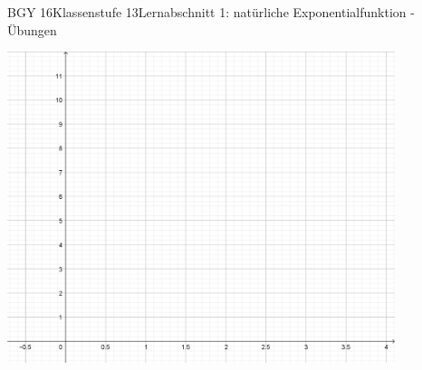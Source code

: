 \documentclass[oneside,openany,headings=optiontotoc,11pt,numbers=noenddot]{scrreprt}
\begin{document}
\begin{worksheet}{BGY 16}{Klassenstufe 13}{Lernabschnitt 1: natürliche Exponentialfunktion - Übungen}
		\par\bigskip\noindent
		\includegraphics[width=0.85\textwidth]{../99_Bilder/01_ExpFkt/KoordLeer.png}\\
	\end{worksheet}
\end{document}
